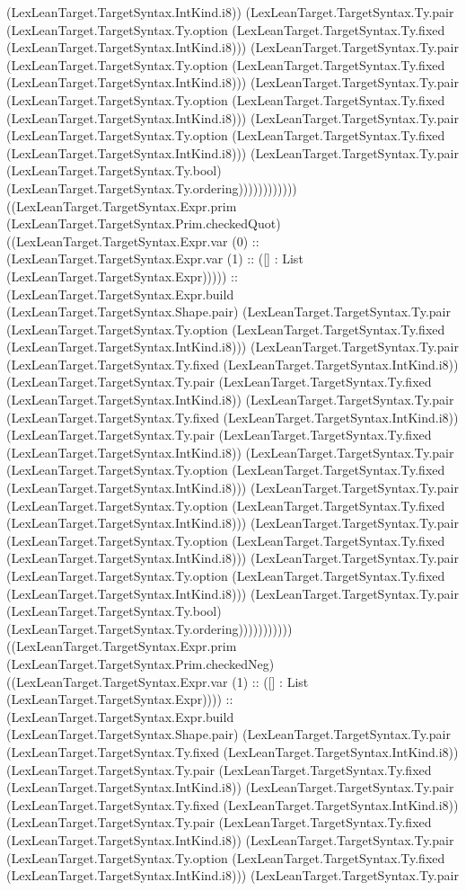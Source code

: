 \documentclass[11pt]{article}
\begin{document}
(LexLeanTarget.TargetSyntax.IntKind.i8)) (LexLeanTarget.TargetSyntax.Ty.pair (LexLeanTarget.TargetSyntax.Ty.option (LexLeanTarget.TargetSyntax.Ty.fixed (LexLeanTarget.TargetSyntax.IntKind.i8))) (LexLeanTarget.TargetSyntax.Ty.pair (LexLeanTarget.TargetSyntax.Ty.option (LexLeanTarget.TargetSyntax.Ty.fixed (LexLeanTarget.TargetSyntax.IntKind.i8))) (LexLeanTarget.TargetSyntax.Ty.pair (LexLeanTarget.TargetSyntax.Ty.option (LexLeanTarget.TargetSyntax.Ty.fixed (LexLeanTarget.TargetSyntax.IntKind.i8))) (LexLeanTarget.TargetSyntax.Ty.pair (LexLeanTarget.TargetSyntax.Ty.option (LexLeanTarget.TargetSyntax.Ty.fixed (LexLeanTarget.TargetSyntax.IntKind.i8))) (LexLeanTarget.TargetSyntax.Ty.pair (LexLeanTarget.TargetSyntax.Ty.bool) (LexLeanTarget.TargetSyntax.Ty.ordering)))))))))))) ((LexLeanTarget.TargetSyntax.Expr.prim (LexLeanTarget.TargetSyntax.Prim.checkedQuot) ((LexLeanTarget.TargetSyntax.Expr.var (0) :: (LexLeanTarget.TargetSyntax.Expr.var (1) :: ([] : List (LexLeanTarget.TargetSyntax.Expr))))) :: (LexLeanTarget.TargetSyntax.Expr.build (LexLeanTarget.TargetSyntax.Shape.pair) (LexLeanTarget.TargetSyntax.Ty.pair (LexLeanTarget.TargetSyntax.Ty.option (LexLeanTarget.TargetSyntax.Ty.fixed (LexLeanTarget.TargetSyntax.IntKind.i8))) (LexLeanTarget.TargetSyntax.Ty.pair (LexLeanTarget.TargetSyntax.Ty.fixed (LexLeanTarget.TargetSyntax.IntKind.i8)) (LexLeanTarget.TargetSyntax.Ty.pair (LexLeanTarget.TargetSyntax.Ty.fixed (LexLeanTarget.TargetSyntax.IntKind.i8)) (LexLeanTarget.TargetSyntax.Ty.pair (LexLeanTarget.TargetSyntax.Ty.fixed (LexLeanTarget.TargetSyntax.IntKind.i8)) (LexLeanTarget.TargetSyntax.Ty.pair (LexLeanTarget.TargetSyntax.Ty.fixed (LexLeanTarget.TargetSyntax.IntKind.i8)) (LexLeanTarget.TargetSyntax.Ty.pair (LexLeanTarget.TargetSyntax.Ty.option (LexLeanTarget.TargetSyntax.Ty.fixed (LexLeanTarget.TargetSyntax.IntKind.i8))) (LexLeanTarget.TargetSyntax.Ty.pair (LexLeanTarget.TargetSyntax.Ty.option (LexLeanTarget.TargetSyntax.Ty.fixed (LexLeanTarget.TargetSyntax.IntKind.i8))) (LexLeanTarget.TargetSyntax.Ty.pair (LexLeanTarget.TargetSyntax.Ty.option (LexLeanTarget.TargetSyntax.Ty.fixed (LexLeanTarget.TargetSyntax.IntKind.i8))) (LexLeanTarget.TargetSyntax.Ty.pair (LexLeanTarget.TargetSyntax.Ty.option (LexLeanTarget.TargetSyntax.Ty.fixed (LexLeanTarget.TargetSyntax.IntKind.i8))) (LexLeanTarget.TargetSyntax.Ty.pair (LexLeanTarget.TargetSyntax.Ty.bool) (LexLeanTarget.TargetSyntax.Ty.ordering))))))))))) ((LexLeanTarget.TargetSyntax.Expr.prim (LexLeanTarget.TargetSyntax.Prim.checkedNeg) ((LexLeanTarget.TargetSyntax.Expr.var (1) :: ([] : List (LexLeanTarget.TargetSyntax.Expr)))) :: (LexLeanTarget.TargetSyntax.Expr.build (LexLeanTarget.TargetSyntax.Shape.pair) (LexLeanTarget.TargetSyntax.Ty.pair (LexLeanTarget.TargetSyntax.Ty.fixed (LexLeanTarget.TargetSyntax.IntKind.i8)) (LexLeanTarget.TargetSyntax.Ty.pair (LexLeanTarget.TargetSyntax.Ty.fixed (LexLeanTarget.TargetSyntax.IntKind.i8)) (LexLeanTarget.TargetSyntax.Ty.pair (LexLeanTarget.TargetSyntax.Ty.fixed (LexLeanTarget.TargetSyntax.IntKind.i8)) (LexLeanTarget.TargetSyntax.Ty.pair (LexLeanTarget.TargetSyntax.Ty.fixed (LexLeanTarget.TargetSyntax.IntKind.i8)) (LexLeanTarget.TargetSyntax.Ty.pair (LexLeanTarget.TargetSyntax.Ty.option (LexLeanTarget.TargetSyntax.Ty.fixed (LexLeanTarget.TargetSyntax.IntKind.i8))) (LexLeanTarget.TargetSyntax.Ty.pair 
\end{document}
